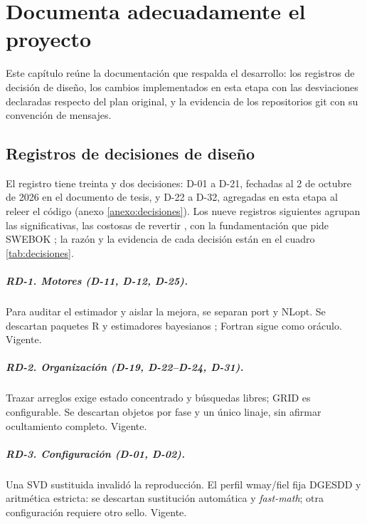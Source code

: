 \chapter{Documenta adecuadamente el proyecto}
\label{cap:documentacion}

Este capítulo reúne la documentación que respalda el desarrollo: los registros de decisión de
diseño, los cambios implementados en esta etapa con las desviaciones declaradas respecto del
plan original, y la evidencia de los repositorios git con su convención de mensajes.

\section{Registros de decisiones de diseño}
\label{sec:registros}

El registro tiene treinta y dos decisiones: D-01 a D-21, fechadas al 2 de octubre de 2026 en
el documento de tesis, y D-22 a D-32, agregadas en esta etapa al releer el código (anexo
\ref{anexo:decisiones}). Los nueve registros siguientes agrupan las significativas, las
costosas de revertir \parencite[cap.~2, §2.4]{swebok2025}, con la fundamentación que pide
SWEBOK \parencite[cap.~3, §4.6]{swebok2025}; la razón y la evidencia de cada decisión están en
el cuadro \ref{tab:decisiones}.

\begingroup
\setbeforeparaskip{-1ex}
\paragraph{RD-1. Motores (D-11, D-12, D-25).} Para auditar el estimador y aislar la mejora,
se separan port y NLopt. Se descartan paquetes R y estimadores bayesianos
\parencite{clinton2004statistical,martin2002dynamic,shin2025l1ideal}; Fortran sigue como oráculo. Vigente.

\paragraph{RD-2. Organización (D-19, D-22--D-24, D-31).} Trazar arreglos exige estado
concentrado y búsquedas libres; GRID es configurable. Se descartan objetos por fase y un
único linaje, sin afirmar ocultamiento completo. Vigente.

\paragraph{RD-3. Configuración (D-01, D-02).} Una SVD sustituida invalidó la reproducción.
El perfil wmay/fiel fija DGESDD y aritmética estricta: se descartan sustitución automática
y \emph{fast-math}; otra configuración requiere otro sello. Vigente.

